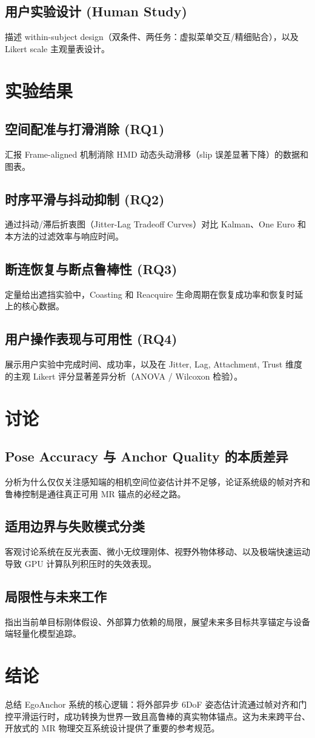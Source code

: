 \documentclass[review]{vgtc}
\begin{document}
\subsection{用户实验设计 (Human Study)}
描述 within-subject design（双条件、两任务：虚拟菜单交互/精细贴合），以及 Likert scale 主观量表设计。

\section{实验结果}

\subsection{空间配准与打滑消除 (RQ1)}
汇报 Frame-aligned 机制消除 HMD 动态头动滑移（slip 误差显著下降）的数据和图表。

\subsection{时序平滑与抖动抑制 (RQ2)}
通过抖动/滞后折衷图（Jitter-Lag Tradeoff Curves）对比 Kalman、One Euro 和本方法的过滤效率与响应时间。

\subsection{断连恢复与断点鲁棒性 (RQ3)}
定量给出遮挡实验中，Coasting 和 Reacquire 生命周期在恢复成功率和恢复时延上的核心数据。

\subsection{用户操作表现与可用性 (RQ4)}
展示用户实验中完成时间、成功率，以及在 Jitter, Lag, Attachment, Trust 维度的主观 Likert 评分显著差异分析（ANOVA / Wilcoxon 检验）。

\section{讨论}

\subsection{Pose Accuracy 与 Anchor Quality 的本质差异}
分析为什么仅仅关注感知端的相机空间位姿估计并不足够，论证系统级的帧对齐和鲁棒控制是通往真正可用 MR 锚点的必经之路。

\subsection{适用边界与失败模式分类}
客观讨论系统在反光表面、微小无纹理刚体、视野外物体移动、以及极端快速运动导致 GPU 计算队列积压时的失效表现。

\subsection{局限性与未来工作}
指出当前单目标刚体假设、外部算力依赖的局限，展望未来多目标共享锚定与设备端轻量化模型追踪。

\section{结论}
总结 EgoAnchor 系统的核心逻辑：将外部异步 6DoF 姿态估计流通过帧对齐和门控平滑运行时，成功转换为世界一致且高鲁棒的真实物体锚点。这为未来跨平台、开放式的 MR 物理交互系统设计提供了重要的参考规范。

\nocite{*}


\end{document}
